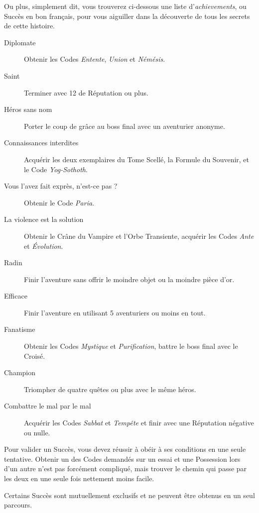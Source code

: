 \documentclass{report}
\begin{document}
Ou plus, simplement dit, vous trouverez ci-dessous une liste d'\emph{achievements}, ou Succès en bon français, pour vous aiguiller dans la découverte de tous les secrets de cette histoire.

\begin{description}
\item[Diplomate] Obtenir les Codes \emph{Entente}, \emph{Union} et \emph{Némésis}.
\item[Saint] Terminer avec 12 de Réputation ou plus.
\item[Héros sans nom] Porter le coup de grâce au boss final avec un aventurier anonyme.
\item[Connaissances interdites] Acquérir les deux exemplaires du Tome Scellé, la Formule du Souvenir, et le Code \emph{Yog-Sothoth}.
\item[Vous l'avez fait exprès, n'est-ce pas ?] Obtenir le Code \emph{Paria}.
\item[La violence est la solution] Obtenir le Crâne du Vampire et l'Orbe Transiente, acquérir les Codes \emph{Ante} et \emph{Évolution}.
\item[Radin] Finir l'aventure sans offrir le moindre objet ou la moindre pièce d'or.
\item[Efficace] Finir l'aventure en utilisant 5 aventuriers ou moins en tout.
\item[Fanatisme] Obtenir les Codes \emph{Mystique} et \emph{Purification}, battre le boss final avec le Croisé.
\item[Champion] Triompher de quatre quêtes ou plus avec le même héros.
\item[Combattre le mal par le mal] Acquérir les Codes \emph{Sabbat} et \emph{Tempête} et finir avec une Réputation négative ou nulle.
\end{description}

Pour valider un Succès, vous devez réussir à obéir à ses conditions en une seule tentative. Obtenir un des Codes demandés sur un essai et une Possession lors d'un autre n'est pas forcément compliqué, mais trouver le chemin qui passe par les deux en une seule fois nettement moins facile.

Certains Succès sont mutuellement exclusifs et ne peuvent être obtenus en un seul parcours.
\end{document}
